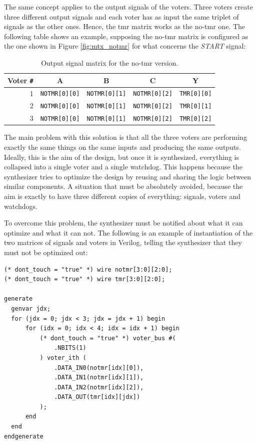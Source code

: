 The same concept applies to the output signals of the voters. Three voters create three different output signals and each voter has as input the same triplet of signals as the other ones. Hence, the tmr matrix works as the no-tmr one. The following table shows an example, supposing the no-tmr matrix is configured as the one shown in Figure \ref{fig:mtx_notmr} for what concerns the \textit{START} signal:

\begin{table}[H]
\centering
\begin{tabular}{ r|ccc|c }
    \textbf{Voter \texttt{\#}}&\textbf{A}&\textbf{B}&\textbf{C}&\textbf{Y}\\
    \hline
    1 & \texttt{NOTMR[0][0]} & \texttt{NOTMR[0][1]} & \texttt{NOTMR[0][2]} & \texttt{TMR[0][0]}\\
    2 & \texttt{NOTMR[0][0]} & \texttt{NOTMR[0][1]} & \texttt{NOTMR[0][2]} & \texttt{TMR[0][1]}\\
    3 & \texttt{NOTMR[0][0]} & \texttt{NOTMR[0][1]} & \texttt{NOTMR[0][2]} & \texttt{TMR[0][2]}\\
\end{tabular}
\caption{Output signal matrix for the no-tmr version.}
\end{table}

The main problem with this solution is that all the three voters are performing exactly the same things on the same inputs and producing the same outputs. Ideally, this is the aim of the design, but once it is synthesized, everything is collapsed into a single voter and a single watchdog. This happens because the synthesizer tries to optimize the design by reusing and sharing the logic between similar components. A situation that must be absolutely avoided, because the aim is exactly to have three different copies of everything: signals, voters and watchdogs.\bigskip

To overcome this problem, the synthesizer must be notified about what it can optimize and what it can not. The following is an example of instantiation of the two matrices of signals and voters in Verilog, telling the synthesizer that they must not be optimized out:

\begin{lstlisting}[style=Verilog]
(* dont_touch = "true" *) wire notmr[3:0][2:0];
(* dont_touch = "true" *) wire tmr[3:0][2:0];

generate
  genvar jdx;
  for (jdx = 0; jdx < 3; jdx = jdx + 1) begin
      for (idx = 0; idx < 4; idx = idx + 1) begin
          (* dont_touch = "true" *) voter_bus #(
              .NBITS(1)
          ) voter_ith (
              .DATA_IN0(notmr[idx][0]),
              .DATA_IN1(notmr[idx][1]),
              .DATA_IN2(notmr[idx][2]),
              .DATA_OUT(tmr[idx][jdx])
          );
      end
  end
endgenerate
\end{lstlisting}

